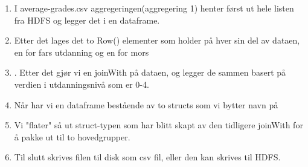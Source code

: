\begin{enumerate}
    \item I average-grades.csv aggregeringen(aggregering 1) henter først ut hele listen fra HDFS og legger det i en dataframe.
    \item Etter det lages det to Row() elementer som holder på hver sin del av dataen, en for fars utdanning og en for mors
    \item . Etter det gjør vi en joinWith på dataen, og legger de sammen basert på verdien i utdanningsnivå som er 0-4.
    \item Når har vi en dataframe bestående av to structs som vi bytter navn på
    \item Vi "flater" så ut struct-typen som har blitt skapt av den tidligere joinWith for å pakke ut til to hovedgrupper.
    \item Til slutt skrives filen til disk som csv fil, eller den kan skrives til HDFS.
  \end{enumerate}
